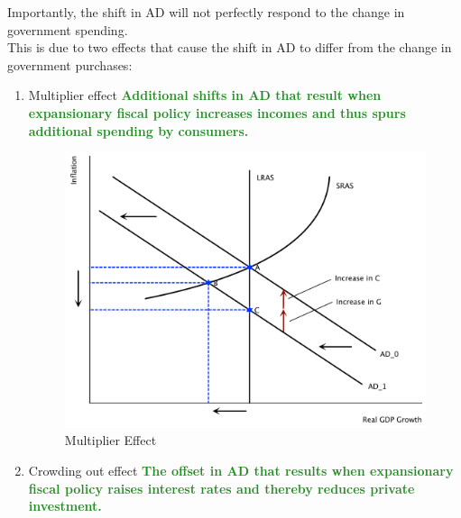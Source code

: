 \documentclass[11pt]{article}\usepackage[]{graphicx}\usepackage[]{color}
\theoremstyle{definition}
\newcommand{\ddp}[1]{{\textbf{\textcolor{ForestGreen}{#1}}}}
\begin{document}
Importantly, the shift in AD will not perfectly respond to the change in government spending. 
\\

This is due to two effects that cause the shift in AD to differ from the change in government purchases:
\begin{enumerate}
	\item Multiplier effect \ddp{Additional shifts in AD that result when expansionary fiscal policy increases incomes and thus spurs additional spending by consumers.}
	
	\begin{figure}[H]
		\centering
		\includegraphics[scale=.40]{plot104.pdf}
		\caption{Multiplier Effect}
	\end{figure}
	
	
	\item Crowding out effect \ddp{The offset in AD that results when expansionary fiscal policy raises interest rates and thereby reduces private investment.}
	

\end{enumerate}
\end{document}

